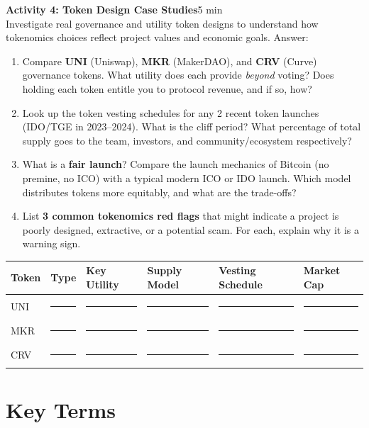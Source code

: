 \documentclass[11pt,a4paper]{article}
\newcommand{\activitybox}[3]{%
  \noindent\colorbox{mllavender4}{\parbox{\dimexpr\linewidth-2\fboxsep}{%
    \textbf{\color{mlpurple}#1}\hfill\textcolor{mlgray}{\small #2}\\[2pt]#3%
  }}\par\vspace{4pt}%
}
\newcommand{\fillcell}{\rule{2.2cm}{0.3pt}}
\begin{document}
\activitybox{Activity 4: Token Design Case Studies}{5 min}{%
Investigate real governance and utility token designs to understand how tokenomics choices reflect project values and economic goals. Answer:
\begin{enumerate}
\item Compare \textbf{UNI} (Uniswap), \textbf{MKR} (MakerDAO), and \textbf{CRV} (Curve) governance tokens. What utility does each provide \emph{beyond} voting? Does holding each token entitle you to protocol revenue, and if so, how?
\item Look up the token vesting schedules for any 2 recent token launches (IDO/TGE in 2023--2024). What is the cliff period? What percentage of total supply goes to the team, investors, and community/ecosystem respectively?
\item What is a \textbf{fair launch}? Compare the launch mechanics of Bitcoin (no premine, no ICO) with a typical modern ICO or IDO launch. Which model distributes tokens more equitably, and what are the trade-offs?
\item List \textbf{3 common tokenomics red flags} that might indicate a project is poorly designed, extractive, or a potential scam. For each, explain why it is a warning sign.
\end{enumerate}
\vspace{4pt}
{\footnotesize\renewcommand{\arraystretch}{1.35}%
\setlength{\tabcolsep}{4pt}%
\begin{tabular}{@{}p{1.6cm}p{2.0cm}p{2.4cm}p{2.2cm}p{3.0cm}p{1.8cm}@{}}
\toprule
\textbf{Token} & \textbf{Type} & \textbf{Key Utility} & \textbf{Supply Model} & \textbf{Vesting Schedule} & \textbf{Market Cap} \\
\midrule
UNI  & \fillcell & \fillcell & \fillcell & \fillcell & \fillcell \\
MKR  & \fillcell & \fillcell & \fillcell & \fillcell & \fillcell \\
CRV  & \fillcell & \fillcell & \fillcell & \fillcell & \fillcell \\
\bottomrule
\end{tabular}}
\vspace{2pt}
}

\vspace{4pt}

\section{Key Terms}
\end{document}
